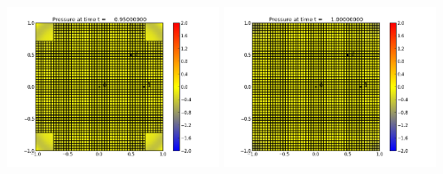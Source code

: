 \documentclass[11pt]{article}
\begin{document}
\vskip 10pt 
\includegraphics[width=0.475\textwidth]{frame0019fig0.png}
\vskip 10pt 
\includegraphics[width=0.475\textwidth]{frame0020fig0.png}
\end{document}
